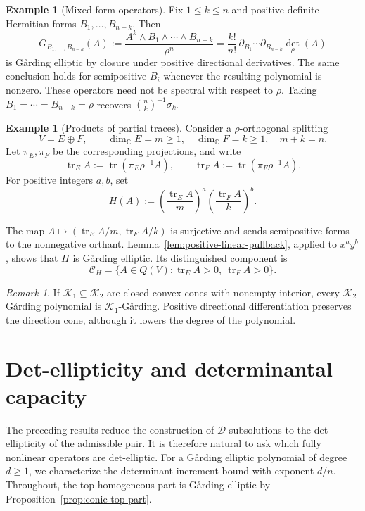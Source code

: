 \documentclass[oneside,english,letterpaper]{amsart}
\numberwithin{equation}{section}
\theoremstyle{plain}
\theoremstyle{definition}
\newtheorem{example}[thm]{Example}
\theoremstyle{remark}
\newtheorem{rem}[thm]{Remark}
\def\pdv{\partial}
\begin{document}
\begin{example}[Mixed-form operators]
\label{example:mixed-form-operators}
Fix $1\leq k\leq n$ and positive definite Hermitian forms
$B_1,\ldots,B_{n-k}$. Then
$$
G_{B_1,\ldots,B_{n-k}}(A)
:=\frac{A^k\wedge B_1\wedge\cdots\wedge B_{n-k}}{\rho^n}
=\frac{k!}{n!}\,
\pdv_{B_1}\cdots\pdv_{B_{n-k}}\det_\rho(A)
$$
is G{\aa}rding elliptic by closure under positive directional
derivatives. The same conclusion holds for semipositive $B_i$
whenever the resulting polynomial is nonzero. These operators
need not be spectral with respect to $\rho$. Taking
$B_1=\cdots=B_{n-k}=\rho$ recovers
$\binom{n}{k}^{-1}\sigma_k$.
\end{example}

\begin{example}[Products of partial traces]
\label{example:products-K-Garding}
Consider a $\rho$-orthogonal splitting
$$
V=E\oplus F,\qquad
\dim_{\mathbb C}E=m\geq1,\quad
\dim_{\mathbb C}F=k\geq1,\quad m+k=n.
$$
Let $\pi_E,\pi_F$ be the corresponding projections, and write
$$
\operatorname{tr}_E A:=\operatorname{tr}(\pi_E\rho^{-1}A),
\qquad
\operatorname{tr}_F A:=\operatorname{tr}(\pi_F\rho^{-1}A).
$$
For positive integers $a,b$, set
$$
H(A):=
\left(\frac{\operatorname{tr}_E A}{m}\right)^a
\left(\frac{\operatorname{tr}_F A}{k}\right)^b.
$$

The map $A\mapsto(\operatorname{tr}_E A/m,\operatorname{tr}_F A/k)$
is surjective and sends semipositive forms to the nonnegative orthant.
Lemma~\ref{lem:positive-linear-pullback}, applied to $x^ay^b$,
shows that $H$ is G{\aa}rding elliptic.
Its distinguished component is
$$
\mathcal C_H
=\{A\in Q(V):\operatorname{tr}_E A>0,\
                  \operatorname{tr}_F A>0\}.
$$
\end{example}
\begin{rem}
\label{rem:monotonicity-direction-cone}
If $\mathcal K_1\subseteq\mathcal K_2$ are closed convex cones
with nonempty interior, every $\mathcal K_2$-G{\aa}rding
polynomial is $\mathcal K_1$-G{\aa}rding. Positive directional
differentiation preserves the direction cone, although it lowers
the degree of the polynomial.
\end{rem}

\section{Det-ellipticity and determinantal capacity}
\label{sec:det-ellipticityanddet}
The preceding results reduce the construction of $\mathcal D$-subsolutions to the det-ellipticity of the admissible pair. It is therefore natural to ask which fully nonlinear operators are det-elliptic. For a G{\aa}rding elliptic polynomial of degree $d\geq1$, we
characterize the determinant increment bound with exponent $d/n$.
Throughout, the top homogeneous part is G{\aa}rding elliptic by
Proposition~\ref{prop:conic-top-part}.
\end{document}
